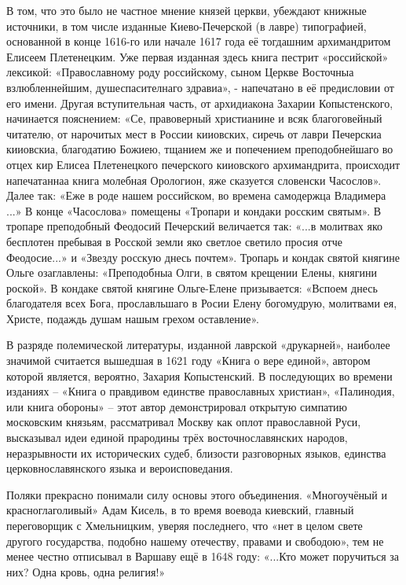 В том, что это было не частное мнение князей церкви, убеждают книжные
источники, в том числе изданные Киево-Печерской (в лавре) типографией,
основанной в конце 1616-го или начале 1617 года её тогдашним архимандритом
Елисеем Плетенецким. Уже первая изданная здесь книга пестрит «российской»
лексикой: «Православному роду российскому, сыном Церкве Восточныа
взлюбленнейшим, душеспасителнаго здравиа», - напечатано в её предисловии от его
имени. Другая вступительная часть, от архидиакона Захарии Копыстенского,
начинается пояснением: «Се, правоверный христианине и всяк благоговейный
читателю, от нарочитых мест в России кииовских, сиречь от лаври Печерскиа
кииовскиа, благодатию Божиею, тщанием же и попечением преподобнейшаго во отцех
кир Елисеа Плетенецкого печерского кииовского архимандрита, происходит
напечатаннаа книга молебная Орологион, яже сказуется словенски Часослов». Далее
так: «Еже в роде нашем российском, во времена самодержца Владимера ...» В конце
«Часослова» помещены «Тропари и кондаки росским святым». В тропаре преподобный
Феодосий Печерский величается так: «...в молитвах яко бесплотен пребывая в
Росской земли яко светлое светило просия отче Феодосие...» и «Звезду росскую
днесь почтем». Тропарь и кондак святой княгине Ольге озаглавлены: «Преподобныа
Олги, в святом крещении Елены, княгини роской». В кондаке святой княгине
Ольге-Елене призывается: «Вспоем днесь благодателя всех Бога, прославльшаго в
Росии Елену богомудрую, молитвами ея, Христе, подаждь душам нашым грехом
оставление».

В разряде полемической литературы, изданной лаврской «друкарней», наиболее
значимой считается вышедшая в 1621 году «Книга о вере единой», автором которой
является, вероятно, Захария Копыстенский. В последующих во времени изданиях –
«Книга о правдивом единстве православных христиан», «Палинодия, или книга
обороны» – этот автор демонстрировал открытую симпатию московским князьям,
рассматривал Москву как оплот православной Руси, высказывал идеи единой
прародины трёх восточнославянских народов, неразрывности их исторических судеб,
близости разговорных языков, единства церковнославянского языка и
вероисповедания.

Поляки прекрасно понимали силу основы этого объединения. «Многоучёный и
красноглаголивый» Адам Кисель, в то время воевода киевский, главный
переговорщик с Хмельницким, уверяя последнего, что «нет в целом свете другого
государства, подобно нашему отечеству, правами и свободою», тем не менее честно
отписывал в Варшаву ещё в 1648 году: «...Кто может поручиться за них? Одна кровь,
одна религия!»

